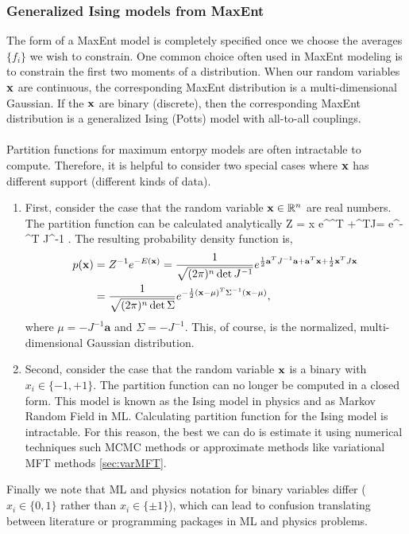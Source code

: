 \subsubsection{Generalized Ising models from MaxEnt}
The form of a MaxEnt model is completely specified once we choose the averages $\{f_i\}$ we wish to constrain. One common choice often used in MaxEnt modeling is to constrain the first two moments of a distribution. When our random variables $\mathbf{x}$ are continuous, the corresponding MaxEnt distribution is a multi-dimensional Gaussian. If the $\mathbf{x}$ are binary (discrete), then the corresponding MaxEnt distribution is a generalized Ising (Potts) model with all-to-all couplings.\\
\\
Partition functions for maximum entorpy models are often intractable to compute. Therefore, it is helpful to consider two special cases where $\mathbf{x}$ has different support (different kinds of data). 
\begin{enumerate}
	\item First, consider the case that the random variable $\mathbf{x} \in \mathbb{R}^n$ are real numbers. The partition function can be calculated analytically
	\bse 
	Z = \int \md x e^{^T +\half {}^TJ\mx}= e^{- \half {}^T J^{-1} }.
	\ese
	The resulting probability density function is,
	\begin{align}
		p(\mathbf{x}) &= Z^{-1} e^{-E(\mathbf{x})} =\frac{1}{\sqrt{(2 \pi)^n \det J^{-1}} } e^{\frac{1}{2} \mathbf{a}^T J^{-1} \mathbf{a}+ \mathbf{a}^T \mathbf{x}+ \frac{1}{2} \mathbf{x}^T J \mathbf{x} }\nonumber \\
		&=\frac{1}{\sqrt{(2 \pi)^n \det \Sigma} } e^{-\frac{1}{2} (\mathbf{x} -\mu)^T \Sigma^{-1} (\mathbf{x}-\mu)},
	\end{align} 
where $\mu=-J^{-1} \mathbf{a}$ and $\Sigma = - J^{-1}$. This, of course, is the normalized, multi-dimensional Gaussian distribution.
\item Second, consider the case that the random variable $\mathbf{x}$ is a binary with $x_i \in \{-1,+1\}$. The partition function can no longer be computed in a closed form. This model is known as the Ising model in physics and as Markov Random Field in ML. Calculating partition function for the Ising model is intractable. For this reason, the best we can do is estimate it using numerical techniques such MCMC methods  or approximate methods like variational MFT methods \ref{sec:varMFT}. 
\end{enumerate}
Finally we note that ML and physics notation for binary variables differ ($x_i \in  \{0,1\}$ rather than $x_i \in \{\pm 1\}$), which can lead to confusion translating between literature or programming packages in ML and physics problems.
